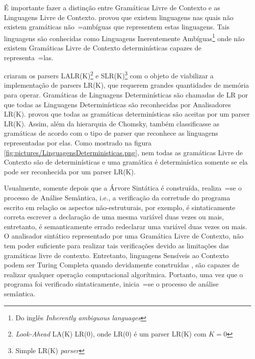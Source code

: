 {    É importante fazer a distinção entre Gramáticas Livre de Contexto e
    as Linguagens Livre de Contexto.
     provou que existem linguagens nas quais não
    existem gramáticas não~=ambíguas que representem estas linguagens.
    Tais linguagens são conhecidas como Linguagens Inerentemente Ambíguas\footnote{Do
    inglês \textit{Inherently ambiguous languages}} onde não existem Gramáticas
    Livre de Contexto determinísticas capazes de representa~=las.

     criaram os parsers
    LALR(K)\footnote{\textit{Look-Ahead} LA(K) LR(0),
    onde LR(0) é um parser LR(K) com $K=0$
    } e
    SLR(K)\footnote{Simple LR(K) \textit{parser}} com o objeto
    de viabilizar a implementação de parsers LR(K),
    que requerem grandes quantidades de memória para operar.
    Gramáticas de Linguagens Determinísticas são chamadas de LR por que todas
    as Linguagens Determinísticas são reconhecidas por Analisadores LR(K).
     provou que todas as gramáticas
    determinísticas são aceitas por um parser LR(K).
    Assim,
    além da hierarquia de Chomsky,
    também classificasse as gramáticas de acordo com o tipo de parser
    que reconhece as linguagens representadas por elas.
    Como mostrado na figura \ref{fig:pictures/LinguagensDeterministicas.png},
    nem todas as gramáticas Livre de Contexto são de determinísticas e
    uma gramática é determinística somente se ela pode ser reconhecida por um parser LR(K).

    Usualmente,
    somente depois que a Árvore Sintática é construída,
    realiza~=se o processo de Análise Semântica,
    i.e.,
    a verificação da corretude do programa escrito em relação os aspectos não-estruturais,
    por exemplo,
    é sintaticamente correta escrever a declaração de uma mesma variável duas vezes ou mais,
    entretanto,
    é semanticamente errado redeclarar uma variável duas vezes ou mais.
    O analisador sintático representado por uma Gramática Livre de Contexto,
    não tem poder suficiente para realizar tais verificações
    devido as limitações das gramáticas livre de contexto.
    Entretanto,
    linguagens Sensíveis ao Contexto podem ser Turing Completa quando devidamente
    construídas \cite{areThereDomainSpecificLanguages,contextSensitiveParsing},
    são capazes de realizar qualquer operação computacional algorítmica.
    Portanto,
    uma vez que o programa foi verificado sintaticamente,
    inicia~=se o processo de análise semântica.

}
